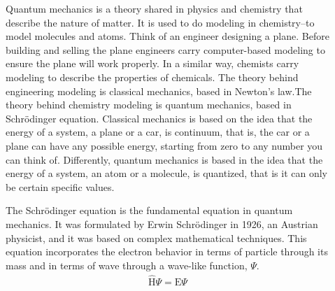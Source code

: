 \documentclass[main.tex]{subfiles}
\begin{document}
\begin{description}
\item[] 
Quantum mechanics is a theory shared in physics and chemistry that describe the nature of matter. It is used to do modeling in chemistry--to model molecules and atoms. Think of an engineer designing a plane. Before building and selling the plane engineers carry computer-based modeling to ensure the plane will work properly. In a similar way, chemists carry modeling to describe the properties of chemicals. The theory behind engineering modeling is classical mechanics, based in Newton's law.The theory behind chemistry modeling is quantum mechanics, based in Schr\"{o}dinger equation. Classical mechanics is based on the idea that the energy of a system, a plane or a car, is continuum, that is, the car or a plane can have any possible energy, starting from zero to any number you can think of. 
Differently, quantum mechanics is based in the idea that the energy of a system, an atom or a molecule, is quantized, that is it can only be certain specific values. 
 \item[] 
The Schr\"{o}dinger equation is the fundamental equation in quantum mechanics. It was formulated by Erwin Schr\"{o}dinger in 1926, an Austrian physicist, and it was based on complex mathematical techniques. This equation incorporates the electron behavior in terms of particle through its mass and in terms of wave through a wave-like function, $\Psi$.
 \begin{equation*}\begin{split}
\hat{\text{H}}\Psi=\text{E}\Psi

\end{split}
\end{equation*}
\end{description}
\end{document}

